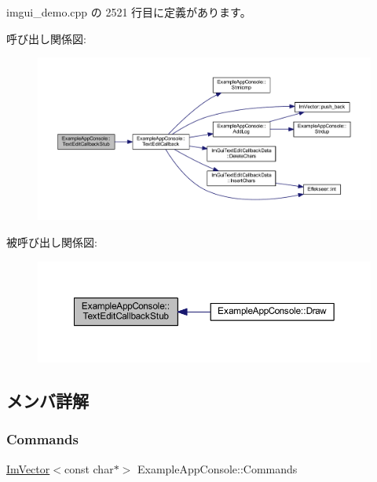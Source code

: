  imgui\+\_\+demo.\+cpp の 2521 行目に定義があります。

呼び出し関係図\+:\nopagebreak
\begin{figure}[H]
\begin{center}
\leavevmode
\includegraphics[width=350pt]{struct_example_app_console_a722d9b5dc6df127f27c83afeee29bfd3_cgraph}
\end{center}
\end{figure}
被呼び出し関係図\+:\nopagebreak
\begin{figure}[H]
\begin{center}
\leavevmode
\includegraphics[width=350pt]{struct_example_app_console_a722d9b5dc6df127f27c83afeee29bfd3_icgraph}
\end{center}
\end{figure}


\subsection{メンバ詳解}
\mbox{\label{struct_example_app_console_a1eebee69cceb0345cf9d9b6e6beb9d03}} 
\subsubsection{\texorpdfstring{Commands}{Commands}}
{\footnotesize\ttfamily \mbox{\hyperlink{class_im_vector}{Im\+Vector}}$<$const char$\ast$$>$ Example\+App\+Console\+::\+Commands}



